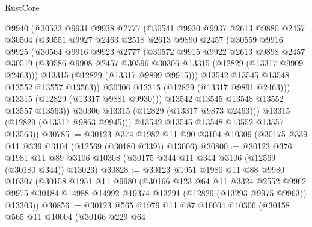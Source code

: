 \begin{lexlean}{RustCore}
\begin{coremodule}
              @9940
              (@30533
                @9931
                @9938
                @2777
                (@30541
                  @9930
                  @9937
                  @2613
                  @9880
                  @2457
                  @30504
                  (@30551
                    @9927
                    @2463
                    @2518
                    @2613
                    @9890
                    @2457
                    (@30559
                      @9916
                      @9925
                      (@30564
                        @9916
                        @9923
                        @2777
                        (@30572
                          @9915
                          @9922
                          @2613
                          @9898
                          @2457
                          @30519
                          (@30586 @9908 @2457 @30596 @30306 @13315 (@12829 (@13317 @9909 @2463)))
                          @13315
                          (@12829 (@13317 @9899 @9915)))
                        @13542
                        @13545
                        @13548
                        @13552
                        @13557
                        @13563))
                    @30306
                    @13315
                    (@12829 (@13317 @9891 @2463)))
                  @13315
                  (@12829 (@13317 @9881 @9930)))
                @13542
                @13545
                @13548
                @13552
                @13557
                @13563))
            @30306
            @13315
            (@12829 (@13317 @9873 @2463)))
          @13315
          (@12829 (@13317 @9863 @9945)))
        @13542
        @13545
        @13548
        @13552
        @13557
        @13563))
@30785 := @30123
    @374
    @1982
    @11
    @90
    @3104
    @10309
    (@30175 @339 @11 @339 @3104 (@12569 (@30180 @339)) @13006)
@30800 := @30123
    @376
    @1981
    @11
    @89
    @3106
    @10308
    (@30175 @344 @11 @344 @3106 (@12569 (@30180 @344)) @13023)
@30828 := @30123
    @1951
    @1980
    @11
    @88
    @9980
    @10307
    (@30158
      @1951
      @11
      @9980
      (@30166
        @123
        @64
        @11
        @3324
        @2552
        @9962
        @9975
        @30184
        @14988
        @14992
        @19374
        @13291
        (@12829 (@13293 @9975 @9963))
        @13303))
@30856 := @30123
    @565
    @1979
    @11
    @87
    @10004
    @10306
    (@30158
      @565
      @11
      @10004
      (@30166
        @229
        @64

\end{coremodule}
\end{lexlean}
